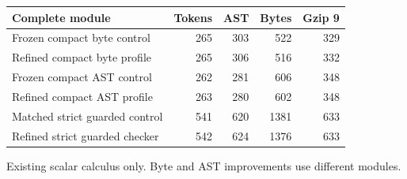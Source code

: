 \begin{center}
\small
\begin{tabular}{lrrrr}
\toprule
Complete module & Tokens & AST & Bytes & Gzip 9\\
\midrule
Frozen compact byte control & 265 & 303 & 522 & 329\\
Refined compact byte profile & 265 & 306 & 516 & 332\\
Frozen compact AST control & 262 & 281 & 606 & 348\\
Refined compact AST profile & 263 & 280 & 602 & 348\\
Matched strict guarded control & 541 & 620 & 1381 & 633\\
Refined strict guarded checker & 542 & 624 & 1376 & 633\\
\bottomrule
\end{tabular}
\par\smallskip
Existing scalar calculus only. Byte and AST improvements use different modules.
\end{center}
